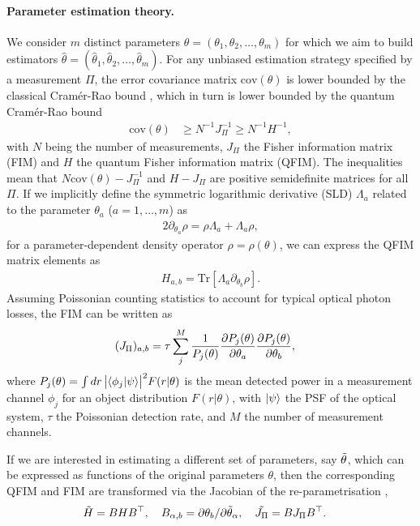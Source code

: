 \documentclass[reprint,amsmath,amssymb,aps,prl,floatfix,groupedaddress,superscriptaddress]{revtex4-2}
\begin{document}
\paragraph{Parameter estimation theory.\label{sec:parameterestimation}}
We consider $m$ distinct parameters $\theta = (\theta_1,\theta_2,\dots,\theta_m)$ for which we aim to build estimators $ \hat{\theta} = (\hat{\theta}_1,\hat{\theta}_2,\dots,\hat{\theta}_m)$. For any unbiased estimation strategy specified by a measurement $\Pi$, the error covariance matrix $\text{cov}(\theta)$ is lower bounded by the classical Cram\'er-Rao bound \cite{lehmann2006theory,van2004detection}, which in turn is lower bounded by the quantum Cram\'er-Rao bound \cite{helstrom1969quantum,braunstein1994statistical}
\begin{align}
    \text{cov}(\theta) &\geq N^{-1} J_\Pi^{-1} \geq N^{-1} H^{-1},
\end{align}
with $N$ being the number of measurements, $J_\Pi$ the Fisher information matrix (FIM) and $H$ the quantum Fisher information matrix (QFIM). The inequalities mean that $N\text{cov}(\theta) - J_\Pi^{-1}$  and $H-J_\Pi$ are positive semidefinite matrices for all $\Pi$. If we implicitly define the symmetric logarithmic derivative (SLD) $\Lambda_a$ related to the parameter $\theta_a$ ($a=1,\dots,m$) as
\begin{align}
   2{\partial_{\theta_a} \rho} = \rho \Lambda_a+ \Lambda_a \rho,
\label{def:sld}
\end{align}
for a parameter-dependent density operator $\rho=\rho(\theta)$, we can express the QFIM matrix elements as
\begin{align}
    H_{a,b} = \text{Tr} \left [ \Lambda_{a} {\partial_{\theta_b} \rho} \right ].
\label{def:QFIM}
\end{align}
Assuming Poissonian counting statistics \cite{tsang2018subdiffraction} to account for typical optical photon losses, the FIM can be written as
\begin{align}
    ({J_\Pi})_{a,b} &= \tau \sum_j^M\frac{1}{P_j(\theta)} \pdv{P_j(\theta)}{\theta_a}  \pdv{P_j(\theta)}{\theta_b},
\label{eq:FI_MS}
\end{align}
where $P_j(\theta) = \int dr\, \big|\!\braket{\phi_j}{\psi}\!\big|^2 F(r|\theta)$ is the mean detected power in a measurement channel $\phi_j$ for an object distribution $F(r|\theta)$, with $\ket{\psi}$ the PSF of the optical system, $\tau$ the Poissonian detection rate, and $M$ the number of measurement channels.

If we are interested in estimating a different set of parameters, say $\Tilde{\theta}$, which can be expressed as functions of the original parameters $\theta$, then the corresponding QFIM and FIM are transformed via the Jacobian of the re-parametrisation \cite{paris2009quantum,liu2020quantum},
\begin{align}
    \Tilde{H} &= B H B^\top, \quad
    B_{\alpha,b} = \partial{\theta_b}/\partial{\Tilde{\theta}_\alpha}, \quad     \Tilde{J_\Pi} = B J_\Pi B^\top.
    \label{def:jacobian}
\end{align}
\end{document}
